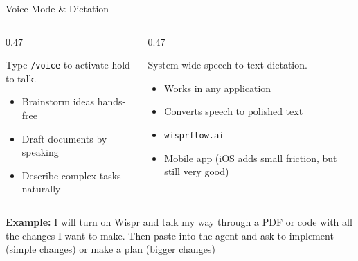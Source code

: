 \documentclass[aspectratio=169, 10pt]{beamer}
\begin{document}
\begin{frame}{Voice Mode \& Dictation}
\begin{columns}[T]
\begin{column}{0.47\textwidth}
\begin{tcolorbox}[keybox, title={\faMicrophone\quad Voice in Claude Code}]
\small
Type \texttt{/voice} to activate hold-to-talk.
\vskip3pt
\begin{itemize}\setlength{\itemsep}{1pt}
  \item Brainstorm ideas hands-free
  \item Draft documents by speaking
  \item Describe complex tasks naturally
\end{itemize}
\end{tcolorbox}
\end{column}
\begin{column}{0.47\textwidth}
\begin{tcolorbox}[keybox, title={\faKeyboard\quad Wispr Flow ($\sim$\$12-15/mo)}]
\small
System-wide speech-to-text dictation.
\vskip3pt
\begin{itemize}\setlength{\itemsep}{1pt}
  \item Works in any application
  \item Converts speech to polished text
  \item \texttt{wisprflow.ai}
  \item Mobile app (iOS adds small friction, but still very good)
\end{itemize}
\end{tcolorbox}
\end{column}
\end{columns}
\vfill 
\begin{tcolorbox}[accentbox, top=3pt, bottom=3pt]
\small \textbf{Example:} I will turn on Wispr and talk my way through a PDF or code with all the changes I want to make. Then paste into the agent and ask to implement (simple changes) or make a plan (bigger changes)
\end{tcolorbox}
\end{frame}
\end{document}

